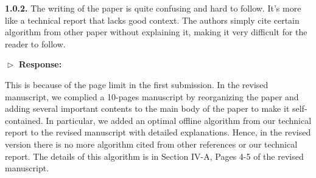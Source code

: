 \documentclass[11pt]{article}
\begin{document}
	\vspace{3mm}
{\color{blue}	
\textbf{1.0.2.} The writing of the paper is quite confusing and hard to follow. It's more like a technical report that lacks good context. The authors simply cite certain algorithm from other paper without explaining it, making it very difficult for the reader to follow.}

\vspace{3mm}
	$\vartriangleright$ \noindent\textbf{Response:} 
	
	This is because of the page limit in the first submission. 
	In the revised manuscript, we complied a 10-pages manuscript by reorganizing the paper and adding several important contents to the main body of the paper to make it self-contained. In particular, we added an optimal offline algorithm from our technical report to the revised manuscript with detailed explanations. Hence, in the revised version there is no more algorithm cited from other references or our technical report. The details of this algorithm is in Section IV-A, Pages 4-5 of the revised manuscript. 

%
\end{document}
